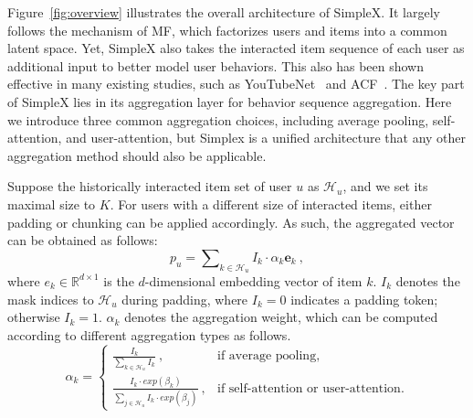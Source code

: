 \documentclass[sigconf,authorversion]{acmart}
\begin{document}
Figure~\ref{fig:overview} illustrates the overall architecture of SimpleX. It largely follows the mechanism of MF, which factorizes users and items into a common latent space. Yet, SimpleX also takes the interacted item sequence of each user as additional input to better model user behaviors. This also has been shown effective in many existing studies, such as YouTubeNet~\cite{YouTubeNet} and ACF~\cite{ACF}. The key part of SimpleX lies in its aggregation layer for behavior sequence aggregation. 
Here we introduce three common aggregation choices, including average pooling, self-attention, and user-attention, but Simplex is a unified architecture that any other aggregation method should also be applicable.

Suppose the historically interacted item set of user $u$ as $\mathcal{H}_u$, and we set its maximal size to $K$. For users with a different size of interacted items, either padding or chunking can be applied accordingly. As such, the aggregated vector can be obtained as follows:
\begin{equation}
{p}_u = \sum\nolimits_{k \in \mathcal{H}_u} I_k\cdot \alpha_k \boldsymbol{e}_k~, \label{equ_aggregation}
\end{equation}
where $e_k\in \mathbb{R}^{d \times 1}$ is the $d$-dimensional embedding vector of item $k$. $I_k$ denotes the mask indices to $\mathcal{H}_u$ during padding, where $I_k=0$ indicates a padding token; otherwise $I_k=1$. $\alpha_k$ denotes the aggregation weight, which can be computed according to different aggregation types as follows.
\begin{equation}
   \alpha_k = \begin{cases}
   \frac{I_k}{\sum\nolimits_{k\in \mathcal{H}_u}I_k}~, & \text{if average pooling}, \\[6pt]
    \frac{I_k\cdot exp(\beta_k)}{\sum_{j \in \mathcal{H}_u} I_k\cdot exp(\beta_j)}~, & \text{if self-attention or user-attention}.
 \end{cases}\label{attention_weight}
\end{equation}
\end{document}
